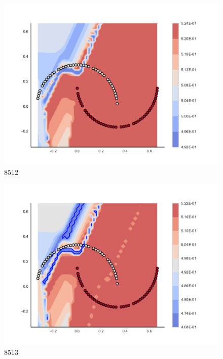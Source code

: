 \begin{subfigure}[b]{0.09\textwidth}
    \includegraphics[clip, trim=2.35cm 1.75cm 4.5cm 0cm,width=\textwidth]{img/convergence/8512.pdf}
    \caption{8512}
    \label{fig:convergence_8512}
\end{subfigure}
%
\begin{subfigure}[b]{0.09\textwidth}
    \includegraphics[clip, trim=2.35cm 1.75cm 4.5cm 0cm,width=\textwidth]{img/convergence/8513.pdf}
    \caption{8513}
    \label{fig:convergence_8513}
\end{subfigure}
%
